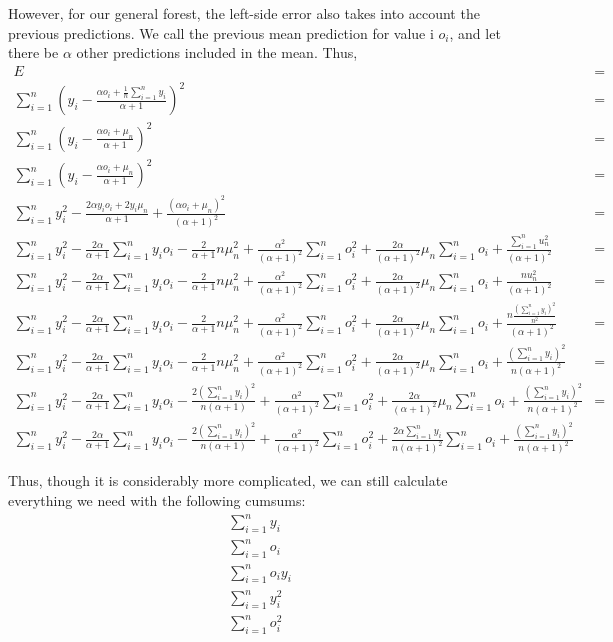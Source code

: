 \documentclass{article}
\begin{document}
However, for our general forest, the left-side error also takes into account the
previous predictions. We call the previous mean prediction for value i $o_i$, 
and let there be $\alpha$ other predictions included in the mean. Thus, 
\begin{align*}
    E &= \\
    \sum_{i=1}^n (y_i - \frac{\alpha o_i + \frac1n \sum_{i=1}^n y_i}{\alpha + 1})^2 &= \\
    \sum_{i=1}^n (y_i - \frac{\alpha o_i + \mu_n}{\alpha + 1})^2 &= \\
    \sum_{i=1}^n (y_i - \frac{\alpha o_i + \mu_n}{\alpha + 1})^2 &= \\
    \sum_{i=1}^{n} y_i^2 - \frac{2\alpha y_i o_i + 2y_i \mu_n}{\alpha + 1} + \frac{(\alpha o_i + \mu_n)^2}{(\alpha + 1)^2} &= \\
    \sum_{i=1}^{n} y_i^2 - \frac{2\alpha}{\alpha + 1} \sum_{i=1}^{n} y_i o_i - \frac{2}{\alpha + 1} n\mu_n^2 + \frac{\alpha^2}{(\alpha + 1)^2} \sum_{i=1}^{n} o_i^2 + \frac{2\alpha}{(\alpha + 1)^2} \mu_n \sum_{i=1}^{n} o_i + \frac{\sum_{i=1}^{n} u_n^2}{(\alpha + 1)^2} &= \\
    \sum_{i=1}^{n} y_i^2 - \frac{2\alpha}{\alpha + 1} \sum_{i=1}^{n} y_i o_i - \frac{2}{\alpha + 1} n\mu_n^2 + \frac{\alpha^2}{(\alpha + 1)^2} \sum_{i=1}^{n} o_i^2 + \frac{2\alpha}{(\alpha + 1)^2} \mu_n \sum_{i=1}^{n} o_i + \frac{n u_n^2}{(\alpha + 1)^2} &= \\
    \sum_{i=1}^{n} y_i^2 - \frac{2\alpha}{\alpha + 1} \sum_{i=1}^{n} y_i o_i - \frac{2}{\alpha + 1} n\mu_n^2 + \frac{\alpha^2}{(\alpha + 1)^2} \sum_{i=1}^{n} o_i^2 + \frac{2\alpha}{(\alpha + 1)^2} \mu_n \sum_{i=1}^{n} o_i + \frac{n \frac{(\sum_{i=1}^{n} y_i)^2}{n^2}}{(\alpha + 1)^2} &= \\
    \sum_{i=1}^{n} y_i^2 - \frac{2\alpha}{\alpha + 1} \sum_{i=1}^{n} y_i o_i - \frac{2}{\alpha + 1} n\mu_n^2 + \frac{\alpha^2}{(\alpha + 1)^2} \sum_{i=1}^{n} o_i^2 + \frac{2\alpha}{(\alpha + 1)^2} \mu_n \sum_{i=1}^{n} o_i + \frac{(\sum_{i=1}^{n} y_i)^2}{n(\alpha + 1)^2} &= \\
    \sum_{i=1}^{n} y_i^2 - \frac{2\alpha}{\alpha + 1} \sum_{i=1}^{n} y_i o_i - \frac{2(\sum_{i=1}^{n} y_i)^2}{n(\alpha + 1)} + \frac{\alpha^2}{(\alpha + 1)^2} \sum_{i=1}^{n} o_i^2 + \frac{2\alpha}{(\alpha + 1)^2} \mu_n \sum_{i=1}^{n} o_i + \frac{(\sum_{i=1}^{n} y_i)^2}{n(\alpha + 1)^2} &= \\
    \sum_{i=1}^{n} y_i^2 - \frac{2\alpha}{\alpha + 1} \sum_{i=1}^{n} y_i o_i - \frac{2(\sum_{i=1}^{n} y_i)^2}{n(\alpha + 1)} + \frac{\alpha^2}{(\alpha + 1)^2} \sum_{i=1}^{n} o_i^2 + \frac{2\alpha \sum_{i=1}^n y_i}{n(\alpha + 1)^2} \sum_{i=1}^{n} o_i + \frac{(\sum_{i=1}^{n} y_i)^2}{n(\alpha + 1)^2}
\end{align*}

Thus, though it is considerably more complicated, we can still calculate everything we need with the following cumsums:
\begin{align*}
    \sum_{i=1}^{n} y_i \\
    \sum_{i=1}^{n} o_i \\
    \sum_{i=1}^{n} o_i y_i \\
    \sum_{i=1}^{n} y_i^2 \\
    \sum_{i=1}^{n} o_i^2 
\end{align*}
\end{document}
